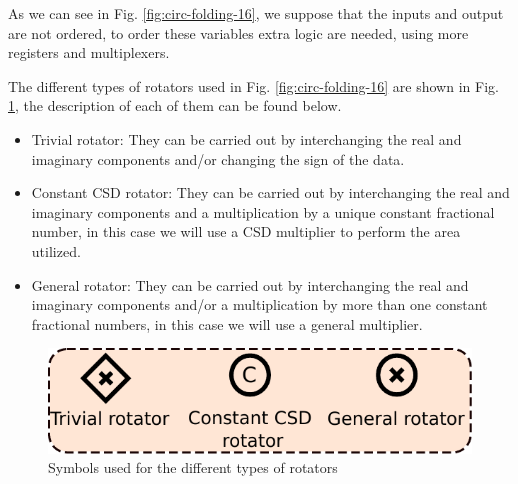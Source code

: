 \documentclass[journal,comsoc]{IEEEtran}
\begin{document}
As we can see in Fig. \ref{fig:circ-folding-16}, we suppose that the inputs and output are not ordered, to order these variables extra logic are needed, using more registers and multiplexers.

The different types of rotators used in Fig. \ref{fig:circ-folding-16} are shown in Fig. \ref{fig:rotators}, the description of each of them can be found below.
\begin{itemize}
	\item Trivial rotator: They can be carried out by interchanging the real and imaginary components and/or changing the sign of the data.
	\item Constant CSD rotator: They can be carried out by interchanging the real and imaginary components and a multiplication by a unique constant fractional number, in this case we will use a CSD multiplier to perform the area utilized.
	\item General rotator: They can be carried out by interchanging the real and imaginary components and/or a multiplication by more than one constant fractional numbers, in this case we will use a general multiplier.
\end{itemize}
\begin{figure}[h!]
	\centering
	\includegraphics[width=0.6\linewidth]{Diagramas/miSeccionFiguras/Rotadores.pdf}
	\caption{Symbols used for the different types of rotators}
	\label{fig:rotators}
\end{figure}



\end{document}
